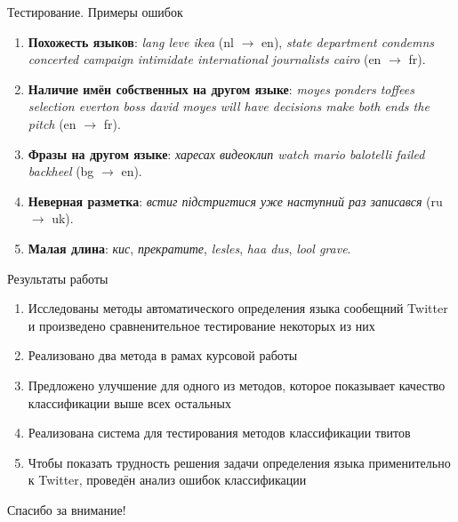 \documentclass[mathserif,utf8,14pt]{beamer}
\begin{document}
\begin{frame}{Тестирование. Примеры ошибок}
    
            \begin{enumerate}
                \item \textbf{Похожесть языков}: \textit{lang leve ikea} (nl $\to$ en), 
                            \textit{state department condemns concerted campaign intimidate international journalists cairo} (en $\to$ fr).
                    \item \textbf{Наличие имён собственных на другом языке}:
                            \textit{moyes ponders toffees selection everton boss david moyes will have decisions make both ends the pitch} (en $\to$ fr).
                        \item \textbf{Фразы на другом языке}:
                            \textit{харесах видеоклип watch mario balotelli failed backheel} (bg $\to$ en).
                        \item \textbf{Неверная разметка}: 
                            \textit{встиг підстригтися уже наступний раз записався} (ru $\to$ uk). 
                        \item \textbf{Малая длина}:
                            \textit{кис}, \textit{прекратите}, \textit{lesles}, \textit{haa dus}, \textit{lool grave}. 
            \end{enumerate}
\end{frame}

\begin{frame}{Результаты работы}
    \begin{enumerate}
        \item Исследованы методы автоматического определения языка сообещний Twitter и произведено сравненительное тестирование некоторых из них
        \item Реализовано два метода в рамах курсовой работы
        \item Предложено улучшение для одного из методов, которое показывает качество классификации выше всех остальных
        \item Реализована система для тестирования методов классификации твитов
        \item Чтобы показать трудность решения задачи определения языка применительно к Twitter, проведён анализ ошибок классификации
    \end{enumerate}
\end{frame}


\begin{frame}{}
    \begin{center}
    \large Спасибо за внимание!
    \end{center}
\end{frame}
\end{document}
